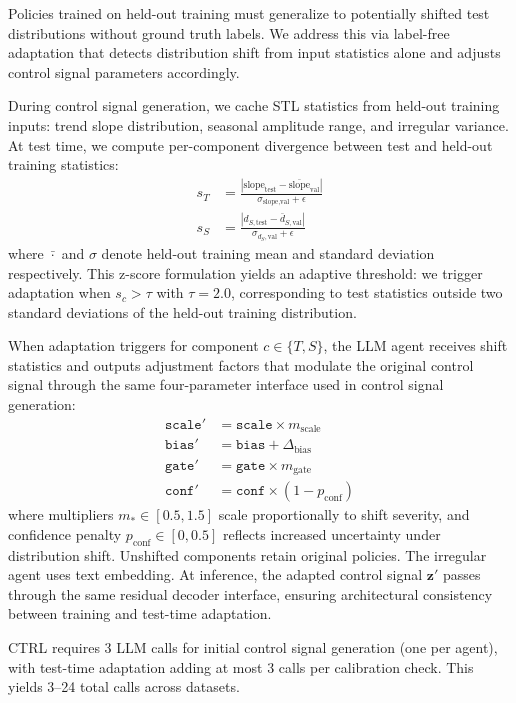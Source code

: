 Policies trained on held-out training must generalize to potentially shifted test distributions without ground truth labels. We address this via label-free adaptation that detects distribution shift from input statistics alone and adjusts control signal parameters accordingly.

During control signal generation, we cache STL statistics from held-out training inputs: trend slope distribution, seasonal amplitude range, and irregular variance. At test time, we compute per-component divergence between test and held-out training statistics:
\begin{align}
    s_T &= \frac{|\text{slope}_\text{test} - \bar{\text{slope}}_\text{val}|}{\sigma_{\text{slope,val}} + \epsilon} \\
    s_S &= \frac{|d_{S,\text{test}} - \bar{d}_{S,\text{val}}|}{\sigma_{d_S,\text{val}} + \epsilon}
\end{align}
where $\bar{\cdot}$ and $\sigma$ denote held-out training mean and standard deviation respectively. This z-score formulation yields an adaptive threshold: we trigger adaptation when $s_c > \tau$ with $\tau = 2.0$, corresponding to test statistics outside two standard deviations of the held-out training distribution.

When adaptation triggers for component $c \in \{T, S\}$, the LLM agent receives shift statistics and outputs adjustment factors that modulate the original control signal through the same four-parameter interface used in control signal generation:
\begin{align}
    \texttt{scale}' &= \texttt{scale} \times m_\text{scale} \\
    \texttt{bias}' &= \texttt{bias} + \Delta_\text{bias} \\
    \texttt{gate}' &= \texttt{gate} \times m_\text{gate} \\
    \texttt{conf}' &= \texttt{conf} \times (1 - p_\text{conf})
\end{align}
where multipliers $m_* \in [0.5, 1.5]$ scale proportionally to shift severity, and confidence penalty $p_\text{conf} \in [0, 0.5]$ reflects increased uncertainty under distribution shift. Unshifted components retain original policies. The irregular agent uses text embedding. At inference, the adapted control signal $\mathbf{z}'$ passes through the same residual decoder interface, ensuring architectural consistency between training and test-time adaptation.

CTRL requires 3 LLM calls for initial control signal generation (one per agent), 
with test-time adaptation adding at most 3 calls per calibration check. This yields 3--24 total calls across datasets.







